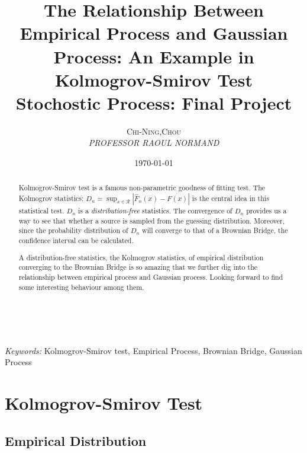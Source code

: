 \documentclass[a4paper, 11pt]{article} %
\title{\textbf{The Relationship Between\\
Empirical Process and Gaussian Process: An Example in Kolmogrov-Smirov Test}\\ %
Stochostic Process: Final Project} %
\author{\textsc{Chi-Ning,Chou} %
\\{\textit{PROFESSOR RAOUL NORMAND }}} %
\date{\today} %
\makeatletter
\renewcommand{\maketitle}{ %
\begin{flushright} %
{\LARGE\@title} %

\vspace{50pt} %

{\large\@author} %
\\\@date %

\vspace{40pt} %
\end{flushright}
}
\makeatother
\begin{document}
\maketitle %



\begin{abstract}
Kolmogrov-Smirov test is a famous non-parametric goodness of fitting test. The Kolmogrov statistics: $D_n = \sup_{x\in \mathcal{R}}|\hat{F}_n(x)-F(x)|$ is the central idea in this statistical test. $D_n$ is a {\it distribution-free} statistics. The convergence of $D_n$ provides us a way to see that whether a source is sampled from the guessing distribution. Moreover, since the probability distribution of $D_n$ will converge to that of a Brownian Bridge, the confidence interval can be calculated.

A distribution-free statistics, the Kolmogrov statistics, of empirical distribution converging to the Brownian Bridge is so amazing that we further dig into the relationship between empirical process and Gaussian process. Looking forward to find some interesting behaviour among them.
\end{abstract}

\hspace*{5,6mm}\textit{Keywords:} Kolmogrov-Smirov test, Empirical Process, Brownian Bridge, Gaussian Process %

\vspace{30pt} %


\tableofcontents
\setcounter{tocdepth}{1}

\section{Kolmogrov-Smirov Test}
\subsection{Empirical Distribution}
\end{document}
